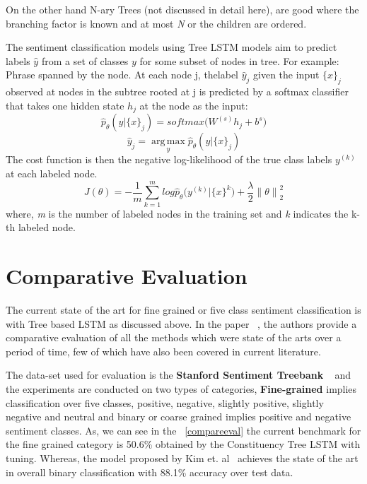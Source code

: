 On the other hand N-ary Trees (not discussed in detail here), are good where the branching factor is known and at most \textit{N} or the children are ordered. 

The sentiment classification models using Tree LSTM models aim to predict labels $\hat{y}$ from a set of classes $y$ for some subset of nodes in tree. For example: Phrase spanned by the node. At each node j, thelabel ${\hat{y}}_{j}$ given the input ${\{x\}}_{j}$  observed at nodes in the subtree rooted at j is predicted by a softmax classifier that takes one hidden state ${h}_{j}$ at the node as the input:
\begin{equation}
{\hat{p}}_{\theta} ( y | {\{x\}}_{j}  ) = softmax  \big(  {W}^{(s)} {h}_{j} + {b}^{s}  \big)
\end{equation}
\begin{equation}
{\hat{y}}_{j} = \operatorname*{arg\,max}_y  {\hat{p}}_{\theta} ( y | {\{x\}}_{j}  )
\end{equation}
The cost function is then the negative log-likelihood of the true class labels ${y}^{(k)}$ at each labeled node.
\begin{equation}
J(\theta) = -\frac{1}{m}  \sum_{k=1}^{m} log {\hat{p}}_{\theta} \big(  {y}^{(k)} | {\{x\}}^{k}\big) + \frac{\lambda}{2}  {\parallel \theta \parallel}_{2}^{2}    
\end{equation}
where, \textit{m} is the number of labeled nodes in the training set and \textit{k} indicates the k-th labeled node.
\section{Comparative Evaluation}
The current state of the art for fine grained or five class sentiment classification is with Tree based LSTM as discussed above. In the paper ~\parencite{lstmsentiment}, the authors provide a comparative evaluation of all the methods which were state of the arts over a period of time, few of which have also been covered in current literature. 
\newline


The data-set used for evaluation is the \textbf{Stanford Sentiment Treebank} ~\parencite{rntnsocher} and the experiments are conducted on two types of categories, \textbf{Fine-grained} implies classification over five classes, positive, negative, slightly positive, slightly negative and neutral and binary or coarse grained implies positive and negative sentiment classes. As, we can see in the ~\autoref{compareeval} the current benchmark for the fine grained category is 50.6\% obtained by the Constituency Tree LSTM with tuning. Whereas, the model proposed by Kim et. al~\parencite{cnnsentence} achieves the state of the art in overall binary classification with 88.1\% accuracy over test data.  

